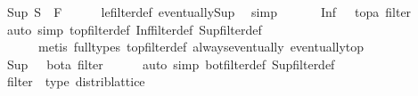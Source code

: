 \begin{isabellebody}
\ {\isachardoublequoteopen}Sup\ S\ {\isasymle}\ F{\isacharprime}{\kern0pt}{\isachardoublequoteclose}\isanewline
\ \ \ \ \isamarkupfalse%
\ le{\isacharunderscore}{\kern0pt}filter{\isacharunderscore}{\kern0pt}def\ eventually{\isacharunderscore}{\kern0pt}Sup\ \isamarkupfalse%
\ simp\ \isacommand{{\isacharbraceright}{\kern0pt}}\isamarkupfalse%
\isanewline
\ \ \isacommand{{\isacharbraceleft}{\kern0pt}}\isamarkupfalse%
\ \isamarkupfalse%
\ {\isachardoublequoteopen}Inf\ {\isacharbraceleft}{\kern0pt}{\isacharbraceright}{\kern0pt}\ {\isacharequal}{\kern0pt}\ {\isacharparenleft}{\kern0pt}top{\isacharcolon}{\kern0pt}{\isacharcolon}{\kern0pt}{\isacharprime}{\kern0pt}a\ filter{\isacharparenright}{\kern0pt}{\isachardoublequoteclose}\isanewline
\ \ \ \ \isamarkupfalse%
\ {\isacharparenleft}{\kern0pt}auto\ simp{\isacharcolon}{\kern0pt}\ top{\isacharunderscore}{\kern0pt}filter{\isacharunderscore}{\kern0pt}def\ Inf{\isacharunderscore}{\kern0pt}filter{\isacharunderscore}{\kern0pt}def\ Sup{\isacharunderscore}{\kern0pt}filter{\isacharunderscore}{\kern0pt}def{\isacharparenright}{\kern0pt}\isanewline
\ \ \ \ \ \ {\isacharparenleft}{\kern0pt}metis\ {\isacharparenleft}{\kern0pt}full{\isacharunderscore}{\kern0pt}types{\isacharparenright}{\kern0pt}\ top{\isacharunderscore}{\kern0pt}filter{\isacharunderscore}{\kern0pt}def\ always{\isacharunderscore}{\kern0pt}eventually\ eventually{\isacharunderscore}{\kern0pt}top{\isacharparenright}{\kern0pt}\ \isacommand{{\isacharbraceright}{\kern0pt}}\isamarkupfalse%
\isanewline
\ \ \isacommand{{\isacharbraceleft}{\kern0pt}}\isamarkupfalse%
\ \isamarkupfalse%
\ {\isachardoublequoteopen}Sup\ {\isacharbraceleft}{\kern0pt}{\isacharbraceright}{\kern0pt}\ {\isacharequal}{\kern0pt}\ {\isacharparenleft}{\kern0pt}bot{\isacharcolon}{\kern0pt}{\isacharcolon}{\kern0pt}{\isacharprime}{\kern0pt}a\ filter{\isacharparenright}{\kern0pt}{\isachardoublequoteclose}\isanewline
\ \ \ \ \isamarkupfalse%
\ {\isacharparenleft}{\kern0pt}auto\ simp{\isacharcolon}{\kern0pt}\ bot{\isacharunderscore}{\kern0pt}filter{\isacharunderscore}{\kern0pt}def\ Sup{\isacharunderscore}{\kern0pt}filter{\isacharunderscore}{\kern0pt}def{\isacharparenright}{\kern0pt}\ \isacommand{{\isacharbraceright}{\kern0pt}}\isamarkupfalse%
\isanewline
{}\isamarkupfalse%
%
\endisatagproof
{\isafoldproof}%
%
\isadelimproof
%
\endisadelimproof
\isanewline
\isanewline
{}\isamarkupfalse%
\isanewline
\isanewline
{}\isamarkupfalse%
\ filter\ {\isacharcolon}{\kern0pt}{\isacharcolon}{\kern0pt}\ {\isacharparenleft}{\kern0pt}type{\isacharparenright}{\kern0pt}\ distrib{\isacharunderscore}{\kern0pt}lattice\isanewline

\end{isabellebody}

